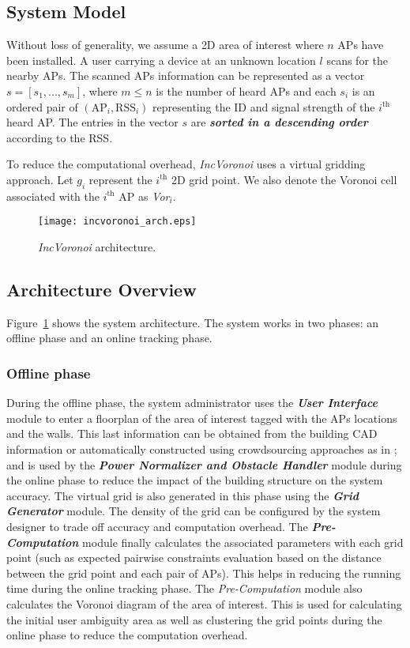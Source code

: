 \documentclass[conference]{IEEEtran}
\def \sys {\textit{IncVoronoi}}
\begin{document}
\subsection{System Model}
Without loss of generality, we assume a 2D area of interest where $n$ APs have been installed. A user carrying a device at an unknown location $l$ scans for the nearby APs. The scanned APs information can be represented as a vector $s=[s_1, ..., s_m]$, where $m\le n$ is the number of heard APs and each $s_i$ is an ordered pair of $(\mathrm{AP}_i, \mathrm{RSS}_i)$ representing the ID and signal strength of the $i^{\textrm{th}}$ heard AP. The entries in the vector $s$ are \textbf{\emph{sorted in a descending order}} according to the RSS.

To reduce the computational overhead, \sys{} uses a virtual gridding approach. Let $g_i$ represent the $i^{\textrm{th}}$ 2D grid point. We also denote the Voronoi cell associated with the $i^{\textrm{th}}$ AP as \emph{Vor}$_i$.

\begin{figure}[!t]
\centering
\texttt{[image: incvoronoi\_arch.eps]}
\caption{\sys{} architecture.}
\label{fig:arch}
\end{figure}

\subsection{Architecture Overview}
Figure~\ref{fig:arch} shows the system architecture. The system works in two phases: an offline phase and an online tracking phase.

\subsubsection{Offline phase} During the offline phase, the system administrator uses the \textbf{\emph{User Interface}} module to enter a floorplan of the area of interest tagged with the APs locations and the walls. This last information can be obtained from the building CAD information or automatically constructed using crowdsourcing approaches as in \cite{crowdinside,elhamshary2014checkinside,elhamshary2015semsense,elhamshary2016transitlabel}; and is used by the \textbf{\emph{Power Normalizer and Obstacle Handler}} module during the online phase to reduce the impact of the building structure on the system accuracy. The virtual grid is also generated in this phase using the \textbf{\emph{Grid Generator}} module. The density of the grid can be configured by the system designer to trade off accuracy and computation overhead. The \textbf{\emph{Pre-Computation}} module finally calculates the associated parameters with each grid point (such as expected pairwise constraints evaluation based on the distance between the grid point and each pair of APs). This helps in reducing the running time during the online tracking phase. The \emph{Pre-Computation} module also calculates the Voronoi diagram of the area of interest. This is used for calculating the initial user ambiguity area as well as clustering the grid points during the online phase to reduce the computation overhead.
\end{document}
